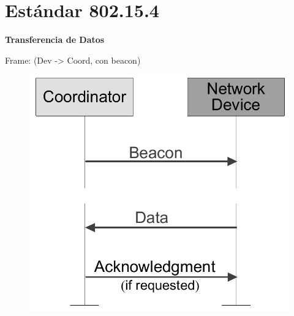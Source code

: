 \documentclass[aspectratio=169]{beamer}
\begin{document}
\section{Estándar 802.15.4}


\begin{frame}{\textbf{Transferencia de Datos}}

Frame: (Dev -> Coord, con beacon)
\vspace{10px}

\begin{figure}[H]
			\includegraphics[height=.8\textheight]{./imagenes/dev-coord-beacon.jpg}
		\end{figure}	 
\end{frame}
\end{document}

